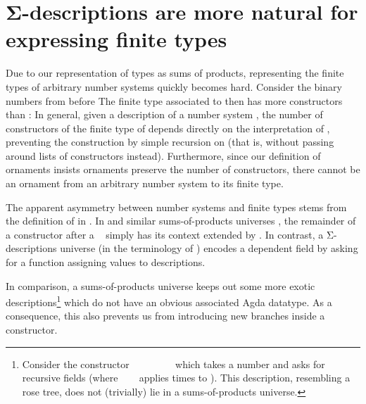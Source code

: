 \section{Σ-descriptions are more natural for expressing finite types}\label{sec:closed-universe}
Due to our representation of types as sums of products, representing the finite types of arbitrary number systems quickly becomes hard. Consider the binary numbers from before
The finite type associated to  then has more constructors than :
In general, given a description of a number system , the number of constructors of the finite type  of  depends directly on the interpretation of , preventing the construction  by simple recursion on  (that is, without passing around lists of constructors instead). Furthermore, since our definition of ornaments insists ornaments preserve the number of constructors, there cannot be an ornament from an arbitrary number system to its finite type. 

The apparent asymmetry between number systems and finite types stems from the definition of  in . In  and similar sums-of-products universes \cite{practgen,sijsling}, the remainder of a constructor  after a \  simply has its context extended by . In contrast, a Σ-descriptions universe \cite{effectfully,progorn,algorn} (in the terminology of \cite{sijsling}) encodes a dependent field  by asking for a function  assigning values  to descriptions. 

In comparison, a sums-of-products universe keeps out some more exotic descriptions\footnote{Consider the constructor \ \bN{}\ \ \ \ \ \ \  which takes a number  and asks for  recursive fields (where \ \ \  applies   times to ). This description, resembling a rose tree, does not (trivially) lie in a sums-of-products universe.} which do not have an obvious associated Agda datatype. As a consequence, this also prevents us from introducing new branches inside a constructor.

